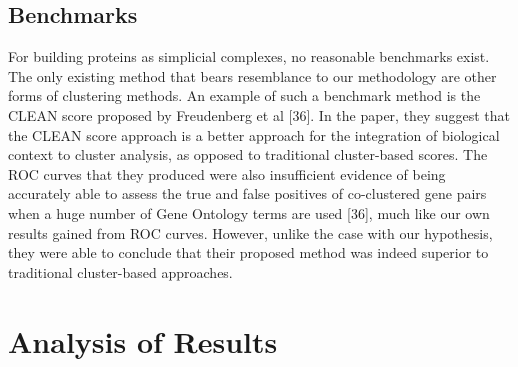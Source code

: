 \documentclass[9pt]{article}
\begin{document}
\subsection{Benchmarks}
For building proteins as simplicial complexes, no reasonable benchmarks exist. The only existing method  that bears resemblance to our methodology are other forms of clustering methods. An example of such a benchmark method is the CLEAN score proposed by Freudenberg et al [36]. In the paper, they suggest that the CLEAN score approach is a better approach for the integration of biological context to cluster analysis, as opposed to traditional cluster-based scores. The ROC curves that they produced were also insufficient evidence of being accurately able to assess the true and false positives of co-clustered gene pairs when a huge number of Gene Ontology terms are used [36], much like our own results gained from ROC curves. However, unlike the case with our hypothesis, they were able to conclude that their proposed method was indeed superior to traditional cluster-based approaches. 

\section{Analysis of Results}
\end{document}
